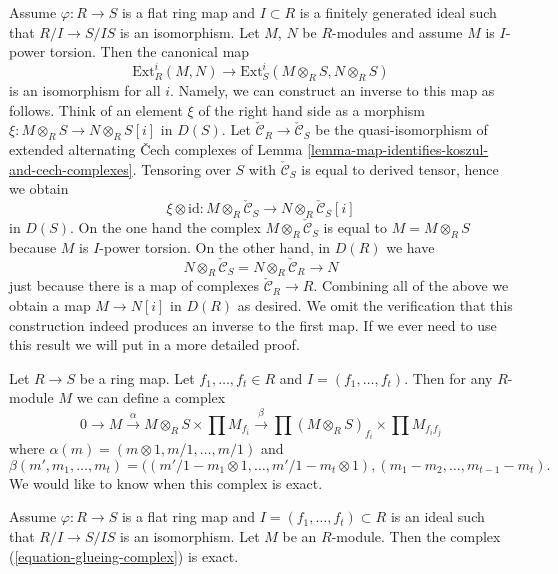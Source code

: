 \begin{remark}
\label{remark-neighbourhood-extensions}
Assume $\varphi : R \to S$ is a flat ring map and $I \subset R$ is a
finitely generated ideal such that $R/I \to S/IS$ is an isomorphism.
Let $M$, $N$ be $R$-modules and assume $M$ is $I$-power torsion.
Then the canonical map
$$
\text{Ext}^i_R(M, N)
\longrightarrow
\text{Ext}^i_S(M \otimes_R S, N \otimes_R S)
$$
is an isomorphism for all $i$. Namely, we can construct an inverse
to this map as follows. Think of an element $\xi$ of the right hand side
as a morphism $\xi : M \otimes_R S \to N \otimes_R S[i]$ in $D(S)$.
Let $\check{\mathcal{C}}_R \to \check{\mathcal{C}}_S$ be
the quasi-isomorphism of extended alternating {\v C}ech complexes of
Lemma \ref{lemma-map-identifies-koszul-and-cech-complexes}.
Tensoring over $S$ with $\check{\mathcal{C}}_S$ is equal to derived
tensor, hence we obtain
$$
\xi \otimes \text{id} :
M \otimes_R \check{\mathcal{C}}_S \to N \otimes_R \check{\mathcal{C}}_S[i]
$$
in $D(S)$. On the one hand the complex $M \otimes_R \check{\mathcal{C}}_S$
is equal to $M = M \otimes_R S$ because $M$ is $I$-power torsion.
On the other hand, in $D(R)$ we have
$$
N \otimes_R \check{\mathcal{C}}_S =
N \otimes_R \check{\mathcal{C}}_R \longrightarrow N
$$
just because there is a map of complexes $\check{\mathcal{C}}_R \to R$.
Combining all of the above we obtain a map $M \to N[i]$ in $D(R)$
as desired. We omit the verification that this construction indeed produces
an inverse to the first map. If we ever need to use this result we will put
in a more detailed proof.
\end{remark}

\noindent
Let $R \to S$ be a ring map.
Let $f_1, \ldots, f_t \in R$ and $I = (f_1, \ldots, f_t)$.
Then for any $R$-module $M$ we can define a complex
\begin{equation}
\label{equation-glueing-complex}
0 \to M \xrightarrow{\alpha}
M \otimes_R S \times \prod M_{f_i} \xrightarrow{\beta}
\prod (M \otimes_R S)_{f_i}
\times
\prod M_{f_if_j}
\end{equation}
where $\alpha(m) = (m \otimes 1, m/1, \ldots, m/1)$ and
$$
\beta(m', m_1, \ldots, m_t) =
((m'/1 - m_1 \otimes 1, \ldots, m'/1 - m_t \otimes 1),
(m_1 - m_2, \ldots, m_{t - 1} - m_t).
$$
We would like to know when this complex is exact.

\begin{lemma}
\label{lemma-recover-module-from-glueing-data}
Assume $\varphi : R \to S$ is a flat ring map and
$I = (f_1, \ldots, f_t) \subset R$ is an ideal such that
$R/I \to S/IS$ is an isomorphism.
Let $M$ be an $R$-module. Then the
complex (\ref{equation-glueing-complex})
is exact.
\end{lemma}


